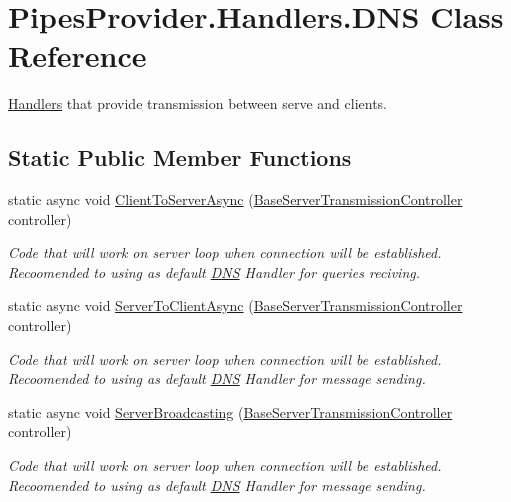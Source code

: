 \hypertarget{class_pipes_provider_1_1_handlers_1_1_d_n_s}{}\section{Pipes\+Provider.\+Handlers.\+D\+NS Class Reference}
\label{class_pipes_provider_1_1_handlers_1_1_d_n_s}


\mbox{\hyperlink{namespace_pipes_provider_1_1_handlers}{Handlers}} that provide transmission between serve and clients.  


\subsection*{Static Public Member Functions}
\begin{DoxyCompactItemize}
\item 
static async void \mbox{\hyperlink{class_pipes_provider_1_1_handlers_1_1_d_n_s_a974e13bf084c0284e4cfe5fecdeb99f7}{Client\+To\+Server\+Async}} (\mbox{\hyperlink{class_pipes_provider_1_1_server_1_1_transmission_controllers_1_1_base_server_transmission_controller}{Base\+Server\+Transmission\+Controller}} controller)
\begin{DoxyCompactList}\small\item\em Code that will work on server loop when connection will be established. Recoomended to using as default \mbox{\hyperlink{class_pipes_provider_1_1_handlers_1_1_d_n_s}{D\+NS}} Handler for queries reciving. \end{DoxyCompactList}\item 
static async void \mbox{\hyperlink{class_pipes_provider_1_1_handlers_1_1_d_n_s_a8c278ec0c39ce0c76cb6ac9c92355aad}{Server\+To\+Client\+Async}} (\mbox{\hyperlink{class_pipes_provider_1_1_server_1_1_transmission_controllers_1_1_base_server_transmission_controller}{Base\+Server\+Transmission\+Controller}} controller)
\begin{DoxyCompactList}\small\item\em Code that will work on server loop when connection will be established. Recoomended to using as default \mbox{\hyperlink{class_pipes_provider_1_1_handlers_1_1_d_n_s}{D\+NS}} Handler for message sending. \end{DoxyCompactList}\item 
static async void \mbox{\hyperlink{class_pipes_provider_1_1_handlers_1_1_d_n_s_af052d964841594776956fc894642ef65}{Server\+Broadcasting}} (\mbox{\hyperlink{class_pipes_provider_1_1_server_1_1_transmission_controllers_1_1_base_server_transmission_controller}{Base\+Server\+Transmission\+Controller}} controller)
\begin{DoxyCompactList}\small\item\em Code that will work on server loop when connection will be established. Recoomended to using as default \mbox{\hyperlink{class_pipes_provider_1_1_handlers_1_1_d_n_s}{D\+NS}} Handler for message sending. \end{DoxyCompactList}\end{DoxyCompactItemize}


